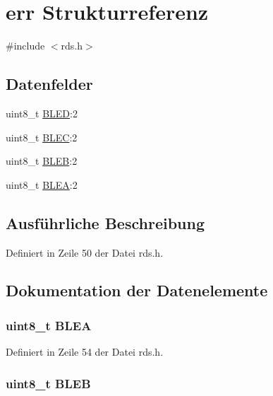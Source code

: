 \hypertarget{structerr}{}\section{err Strukturreferenz}
\label{structerr}


{\ttfamily \#include $<$rds.\+h$>$}

\subsection*{Datenfelder}
\begin{DoxyCompactItemize}
\item 
uint8\+\_\+t \hyperlink{structerr_a3498d51c8fc84119a00242f7bb9b6719}{B\+L\+E\+D}\+:2
\item 
uint8\+\_\+t \hyperlink{structerr_a279b7213c9f5034e0fa7aa8d9c2bc9a2}{B\+L\+E\+C}\+:2
\item 
uint8\+\_\+t \hyperlink{structerr_aadd978be8508790bbf25c9a488ea553c}{B\+L\+E\+B}\+:2
\item 
uint8\+\_\+t \hyperlink{structerr_a22256b3ddf2070027c87504d1de20c2f}{B\+L\+E\+A}\+:2
\end{DoxyCompactItemize}


\subsection{Ausführliche Beschreibung}


Definiert in Zeile 50 der Datei rds.\+h.



\subsection{Dokumentation der Datenelemente}
\hypertarget{structerr_a22256b3ddf2070027c87504d1de20c2f}{}
\subsubsection[{B\+L\+E\+A}]{\setlength{\rightskip}{0pt plus 5cm}uint8\+\_\+t B\+L\+E\+A}\label{structerr_a22256b3ddf2070027c87504d1de20c2f}


Definiert in Zeile 54 der Datei rds.\+h.

\hypertarget{structerr_aadd978be8508790bbf25c9a488ea553c}{}
\subsubsection[{B\+L\+E\+B}]{\setlength{\rightskip}{0pt plus 5cm}uint8\+\_\+t B\+L\+E\+B}\label{structerr_aadd978be8508790bbf25c9a488ea553c}


